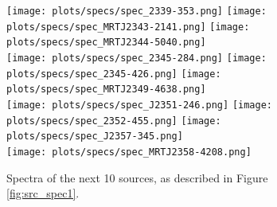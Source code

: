 \documentclass[preprint]{aastex}
\begin{document}
\begin{figure}\centering
\texttt{[image: plots/specs/spec\_2339-353.png]}
\texttt{[image: plots/specs/spec\_MRTJ2343-2141.png]}
\texttt{[image: plots/specs/spec\_MRTJ2344-5040.png]}\\
\texttt{[image: plots/specs/spec\_2345-284.png]}
\texttt{[image: plots/specs/spec\_2345-426.png]}
\texttt{[image: plots/specs/spec\_MRTJ2349-4638.png]}\\
\texttt{[image: plots/specs/spec\_J2351-246.png]}
\texttt{[image: plots/specs/spec\_2352-455.png]}
\texttt{[image: plots/specs/spec\_J2357-345.png]}\\
\texttt{[image: plots/specs/spec\_MRTJ2358-4208.png]}
\caption{Spectra of the next 10 sources, as described in Figure \ref{fig:src_spec1}.
}\label{fig:src_spec34}
\end{figure}




\end{document}
